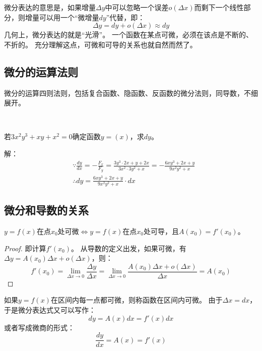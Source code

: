 微分表达的意思是，如果增量$\Delta y$中可以忽略一个误差$o\left( \Delta x \right) $而剩下一个线性部分，则增量可以用一个“微增量$dy$”代替，即：
\[
\Delta y=dy+o\left( \Delta x \right) \approx dy
\]
几何上，微分表达的就是“光滑”。
一个函数在某点可微，必须在该点是不断的、不折的。
充分理解这点，可微和可导的关系也就自然而然了。

\subsection{微分的运算法则}

微分的运算四则法则，包括复合函数、隐函数、反函数的微分法则，同导数，不细展开。

~

\begin{example}
若$3x^2y^3+xy+x^2=0$确定函数$y=\left( x \right) $，求$dy$。
\end{example}

解：
\begin{align*}
&\because \frac{dy}{dx}=-\frac{F_x}{F_y}=\frac{3y^3\cdot 2x+y+2x}{3x^2\cdot 3y^2+x}=-\frac{6xy^3+2x+y}{9x^2y^2+x} \\
&\therefore dy=\frac{6xy^3+2x+y}{9x^2y^2+x}\cdot dx
\end{align*}

\subsection{微分和导数的关系}

\begin{theorem}[微分定理]
$y=f\left( x \right) $在点$x_0$处可微$\Leftrightarrow y=f\left( x \right) $在点$x_0$处可导，且$A\left( x_0 \right) =f'\left( x_0 \right) $。
\end{theorem}

\begin{proof}
即计算$f'\left( x_0 \right) $。
从导数的定义出发，如果可微，有$\Delta y=A\left( x_0 \right) \Delta x+o\left( \Delta x \right) $，则：
\[
f'\left( x_0 \right) =\underset{\Delta x\rightarrow 0}{\lim}\frac{\Delta y}{\Delta x}=\underset{\Delta x\rightarrow 0}{\lim}\frac{A\left( x_0 \right) \Delta x+o\left( \Delta x \right)}{\Delta x}=A\left( x_0 \right)
\]
\end{proof}

如果$y=f\left( x \right) $在区间内每一点都可微，则称函数在区间内可微。
由于$\Delta x=dx$，于是微分表达式又可以写作：
\[
dy=A\left( x \right) dx=f'\left( x \right) dx
\]
或者写成微商的形式：
\[
\frac{dy}{dx}=A\left( x \right) =f'\left( x \right)
\]

